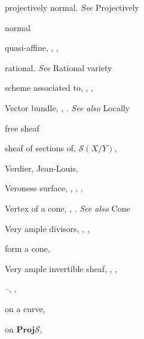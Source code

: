 {{\noindent\hspace*{7.5bp}projectively normal. \emph{See} Projectively\par
\noindent\hspace*{15.0bp}normal\par
\noindent\hspace*{7.5bp}quasi-affine, , , \par
\noindent\hspace*{7.5bp}rational. \emph{See} Rational variety\par
\noindent\hspace*{7.5bp}scheme associated to, , , \par
\noindent\hspace*{0.0bp}Vector bundle, , . \emph{See also} Locally\par
\noindent\hspace*{15.0bp}free sheaf\par
\noindent\hspace*{7.5bp}sheaf of sections of, $\mathcal S(X/Y)$, \par
\noindent\hspace*{0.0bp}Verdier, Jean-Louis, \par
\noindent\hspace*{0.0bp}Veronese surface, , , , \par
\noindent\hspace*{0.0bp}Vertex of a cone, , . \emph{See also} Cone\par
\noindent\hspace*{0.0bp}Very ample divisors, , , \par
\noindent\hspace*{7.5bp}form a cone, \par
\noindent\hspace*{0.0bp}Very ample invertible sheaf, , ,\par
\noindent\hspace*{15.0bp}--, , \par
\noindent\hspace*{7.5bp}on a curve, \par
\noindent\hspace*{7.5bp}on $\mathbf{Proj}\mathcal S$, \par
}}

